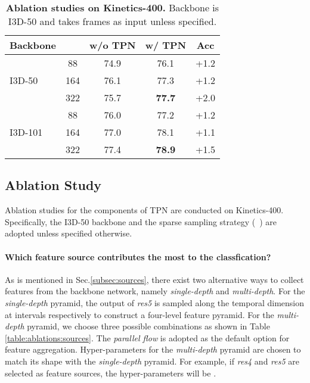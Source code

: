 \documentclass[10pt,twocolumn,letterpaper]{article}
\begin{document}
\begin{table*}[t]
{        \begin{tabular}{lcccc}
            \hline
            Backbone     &                & w/o TPN     &   w/ TPN       &  Acc        \\ \hline
                         & 88                & 74.9        &   76.1         &  +1.2                      \\
            I3D-50       & 164               & 76.1        &   77.3         &  +1.2                    \\
                         & 322               & 75.7        &   \textbf{77.7}&  +2.0                    \\ \hline
                         & 88                & 76.0        &   77.2         &  +1.2                     \\
            I3D-101      & 164               & 77.0        &   78.1         &  +1.1                     \\
                         & 322               & 77.4        &   \textbf{78.9}&  +1.5                     \\ \hline
\end{tabular}
    }
    
    \vspace{1em}
    \caption{
        \textbf{Ablation studies on Kinetics-400.}
        Backbone is I3D-50 and takes  frames as input unless specified.
        }
    \label{table:ablations}
\end{table*}


\subsection{Ablation Study}\label{subsec:ablation}
Ablation studies for the components of TPN are conducted on Kinetics-400.
Specifically, the I3D-50 backbone and the sparse sampling strategy (\ie~) are adopted unless specified otherwise.


\paragraph{Which feature source contributes the most to the classfication?}
As is mentioned in Sec.\ref{subsec:sources}, there exist two alternative ways to collect features from the backbone network, namely \emph{single-depth} and \emph{multi-depth}.
For the \emph{single-depth} pyramid, the output of \emph{res5} is sampled along the temporal dimension at  intervals respectively to construct a four-level feature pyramid.
For the \emph{multi-depth} pyramid, we choose three possible combinations as shown in Table \ref{table:ablations:sources}.
The \emph{parallel flow} is adopted as the default option for feature aggregation. 
Hyper-parameters  for the \emph{multi-depth} pyramid are chosen to match its shape with the \emph{single-depth} pyramid.
For example, if \emph{res4} and \emph{res5} are selected as feature sources, the hyper-parameters will be .
\end{document}
